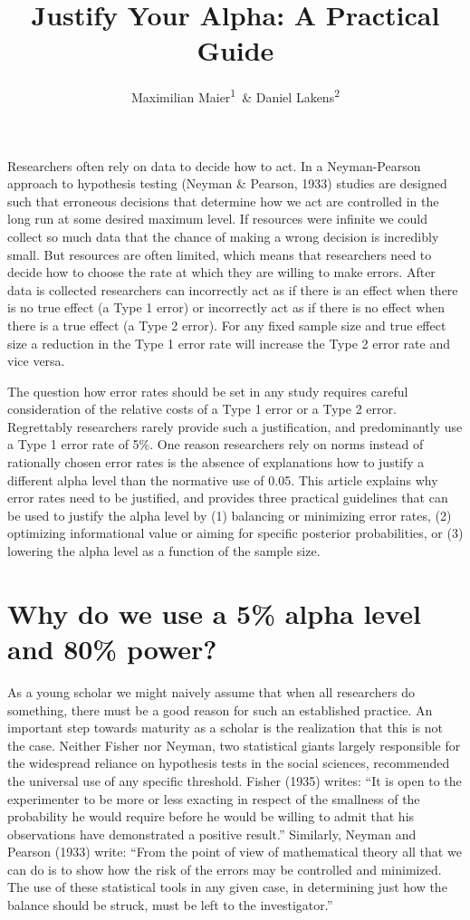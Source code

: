 \documentclass[
  english,
  ,jou,floatsintext]{apa6}
\author{Maximilian Maier\textsuperscript{1}\ \& Daniel Lakens\textsuperscript{2}}
\affiliation{
\vspace{0.5cm}
\textsuperscript{1} University of Amsterdam, The Netherlands\\\textsuperscript{2} Eindhoven University of Technology, The Netherlands}
\title{Justify Your Alpha: A Practical Guide}
\date{}
\begin{document}
\maketitle

Researchers often rely on data to decide how to act. In a Neyman-Pearson approach to hypothesis testing (Neyman \& Pearson, 1933) studies are designed such that erroneous decisions that determine how we act are controlled in the long run at some desired maximum level. If resources were infinite we could collect so much data that the chance of making a wrong decision is incredibly small. But resources are often limited, which means that researchers need to decide how to choose the rate at which they are willing to make errors. After data is collected researchers can incorrectly act as if there is an effect when there is no true effect (a Type 1 error) or incorrectly act as if there is no effect when there is a true effect (a Type 2 error). For any fixed sample size and true effect size a reduction in the Type 1 error rate will increase the Type 2 error rate and vice versa.

The question how error rates should be set in any study requires careful consideration of the relative costs of a Type 1 error or a Type 2 error. Regrettably researchers rarely provide such a justification, and predominantly use a Type 1 error rate of 5\%. One reason researchers rely on norms instead of rationally chosen error rates is the absence of explanations how to justify a different alpha level than the normative use of 0.05. This article explains why error rates need to be justified, and provides three practical guidelines that can be used to justify the alpha level by (1) balancing or minimizing error rates, (2) optimizing informational value or aiming for specific posterior probabilities, or (3) lowering the alpha level as a function of the sample size.

\hypertarget{why-do-we-use-a-5-alpha-level-and-80-power}{%
\section{Why do we use a 5\% alpha level and 80\% power?}\label{why-do-we-use-a-5-alpha-level-and-80-power}}

As a young scholar we might naively assume that when all researchers do something, there must be a good reason for such an established practice. An important step towards maturity as a scholar is the realization that this is not the case. Neither Fisher nor Neyman, two statistical giants largely responsible for the widespread reliance on hypothesis tests in the social sciences, recommended the universal use of any specific threshold. Fisher (1935) writes: ``It is open to the experimenter to be more or less exacting in respect of the smallness of the probability he would require before he would be willing to admit that his observations have demonstrated a positive result.'' Similarly, Neyman and Pearson (1933) write: ``From the point of view of mathematical theory all that we can do is to show how the risk of the errors may be controlled and minimized. The use of these statistical tools in any given case, in determining just how the balance should be struck, must be left to the investigator.''
\end{document}
